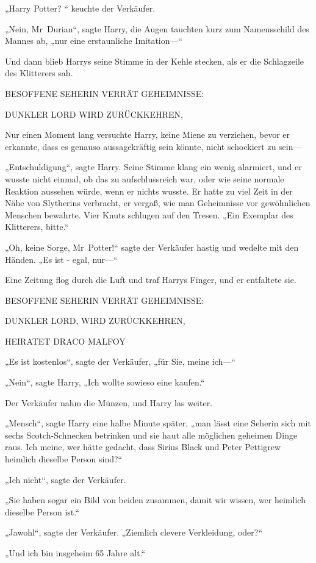 {„Harry Potter? “ keuchte der Verkäufer.

„Nein, Mr~Durian“, sagte Harry, die Augen tauchten kurz zum Namensschild des Mannes ab, „nur eine erstaunliche Imitation—“

Und dann blieb Harrys seine Stimme in der Kehle stecken, als er die Schlagzeile des Klitterers sah.

BESOFFENE SEHERIN VERRÄT GEHEIMNISSE:

DUNKLER LORD WIRD ZURÜCKKEHREN,

Nur einen Moment lang versuchte Harry, keine Miene zu verziehen, bevor er erkannte, dass es genauso aussagekräftig sein könnte, nicht schockiert zu sein—

„Entschuldigung“, sagte Harry. Seine Stimme klang ein wenig alarmiert, und er wusste nicht einmal, ob das zu aufschlussreich war, oder wie seine normale Reaktion aussehen würde, wenn er nichts wusste. Er hatte zu viel Zeit in der Nähe von Slytherins verbracht, er vergaß, wie man Geheimnisse vor gewöhnlichen Menschen bewahrte. Vier Knuts schlugen auf den Tresen. „Ein Exemplar des Klitterers, bitte.“

„Oh, keine Sorge, Mr~Potter!“ sagte der Verkäufer hastig und wedelte mit den Händen. „Es ist - egal, nur—“

Eine Zeitung flog durch die Luft und traf Harrys Finger, und er entfaltete sie.

BESOFFENE SEHERIN VERRÄT GEHEIMNISSE:

DUNKLER LORD, WIRD ZURÜCKKEHREN,

HEIRATET DRACO MALFOY

„Es ist kostenlos“, sagte der Verkäufer, „für Sie, meine ich—“

„Nein“, sagte Harry, „Ich wollte sowieso eine kaufen.“

Der Verkäufer nahm die Münzen, und Harry las weiter.

„Mensch“, sagte Harry eine halbe Minute später, „man lässt eine Seherin sich mit sechs Scotch-Schnecken betrinken und sie haut alle möglichen geheimen Dinge raus. Ich meine, wer hätte gedacht, dass Sirius Black und Peter Pettigrew heimlich dieselbe Person sind?“

„Ich nicht“, sagte der Verkäufer.

„Sie haben sogar ein Bild von beiden zusammen, damit wir wissen, wer heimlich dieselbe Person ist.“

„Jawohl“, sagte der Verkäufer. „Ziemlich clevere Verkleidung, oder?“

„Und ich bin insgeheim 65 Jahre alt.“

}
